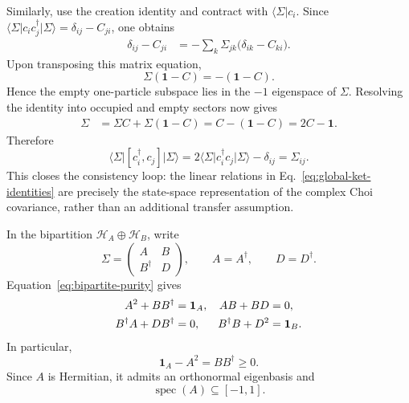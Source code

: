 \documentclass[aps,prb,onecolumn,nofootinbib,superscriptaddress]{revtex4-2}
\newcommand{\I}{\mathbf{1}}
\newcommand{\ket}[1]{\lvert #1\rangle}
\newcommand{\bra}[1]{\langle #1\rvert}
\newcommand{\cH}{\mathcal{H}}
\theoremstyle{plain}
\theoremstyle{definition}
\begin{document}
Similarly, use the creation identity and contract with
\(\bra{\Sigma}c_i\).  Since
\(
  \bra{\Sigma}c_i c_j^\dagger\ket{\Sigma}
  =
  \delta_{ij}-C_{ji}
\),
one obtains
\begin{align}
  \delta_{ij}-C_{ji}
  &=
  -\sum_k\Sigma_{jk}
  \bigl(\delta_{ik}-C_{ki}\bigr).
  \label{eq:creation-contraction-components}
\end{align}
Upon transposing this matrix equation,
\begin{equation}
  \Sigma(\I-C)=-(\I-C).
  \label{eq:empty-minus-sector}
\end{equation}
Hence the empty one-particle subspace lies in the \(-1\) eigenspace of
\(\Sigma\).  Resolving the identity into occupied and empty sectors now
gives
\begin{align}
  \Sigma
  &=
  \Sigma C+\Sigma(\I-C)
  =
  C-(\I-C)
  =
  2C-\I .
  \label{eq:state-identities-recover-covariance}
\end{align}
Therefore
\begin{equation}
  \boxed{
  \bra{\Sigma}[c_i^\dagger,c_j]\ket{\Sigma}
  =
  2\bra{\Sigma}c_i^\dagger c_j\ket{\Sigma}
  -
  \delta_{ij}
  =
  \Sigma_{ij}.
  }
  \label{eq:explicit-complex-covariance-check}
\end{equation}
This closes the consistency loop: the linear relations in
Eq.~\eqref{eq:global-ket-identities} are precisely the state-space
representation of the complex Choi covariance, rather than an additional
transfer assumption.

In the bipartition \(\cH_A\oplus\cH_B\), write
\begin{equation}
  \Sigma
  =
  \begin{pmatrix}
    A & B\\
    B^\dagger & D
  \end{pmatrix},
  \qquad
  A=A^\dagger,
  \qquad
  D=D^\dagger .
  \label{eq:bipartite-blocks}
\end{equation}
Equation~\eqref{eq:bipartite-purity} gives
\begin{align}
  A^2+BB^\dagger&=\I_A,
  &
  AB+BD&=0,
  \label{eq:bipartite-involution-identities}\\
  B^\dagger A+DB^\dagger&=0,
  &
  B^\dagger B+D^2&=\I_B.
  \notag
\end{align}
In particular,
\begin{equation}
  \I_A-A^2=BB^\dagger\geq0.
  \label{eq:A-spectral-bound}
\end{equation}
Since \(A\) is Hermitian, it admits an orthonormal eigenbasis and
\begin{equation}
  \operatorname{spec}(A)\subseteq[-1,1].
  \label{eq:A-spectrum-interval}
\end{equation}
\end{document}
